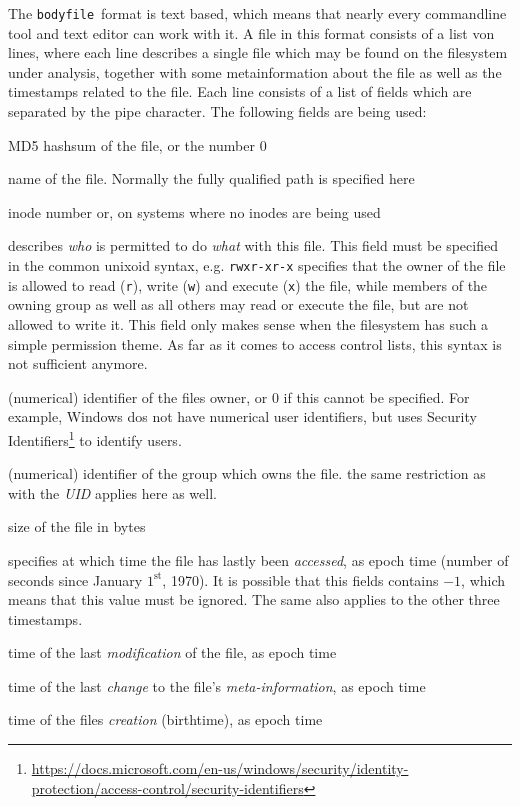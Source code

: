 \documentclass[twocolumn]{article}
\newcommand{\bodyfile}{\texttt{bodyfile}}
\begin{document}
The \bodyfile\ format is text based, which means that nearly every commandline tool and text editor can work with it. A file in this format consists of a list von lines, where each line describes a single file which may be found on the filesystem under analysis, together with some metainformation about the file as well as the timestamps related to the file. Each line consists of a list of fields which are separated by the pipe character. The following fields are being used:

\begin{description}[font=\ttfamily]
\item[MD5] MD5 hashsum of the file, or the number $0$
\item[name] name of the file. Normally the fully qualified path is specified here
\item[inode] inode number or, on systems where no inodes are being used
\item[mode] describes \emph{who} is permitted to do \emph{what} with this file. This field must be specified in the common unixoid syntax, e.g. \texttt{rwxr-xr-x} specifies that the owner of the file is allowed to read (\texttt{r}), write (\texttt{w}) and execute (\texttt{x}) the file, while members of the owning group as well as all others may read or execute the file, but are not allowed to write it. This field only makes sense when the filesystem has such a simple permission theme. As far as it comes to access control lists, this syntax is not sufficient anymore.
\item[UID] (numerical) identifier of the files owner, or $0$ if this cannot be specified. For example, Windows dos not have numerical user identifiers, but uses Security Identifiers\footnote{\url{https://docs.microsoft.com/en-us/windows/security/identity-protection/access-control/security-identifiers}} to identify users.
\item[GID] (numerical) identifier of the group which owns the file. the same restriction as with the \emph{UID} applies here as well.
\item[size] size of the file in bytes
\item[atime] specifies at which time the file has lastly been \emph{accessed}, as epoch time (number of seconds since January $1^\text{st}$, 1970). It is possible that this fields contains $-1$, which means that this value must be ignored. The same also applies to the other three timestamps.
\item[mtime] time of the last \emph{modification} of the file, as epoch time
\item[ctime] time of the last \emph{change} to the file's \emph{meta-information}, as epoch time
\item[crtime] time of the files \emph{creation} (birthtime), as epoch time
\end{description}
\end{document}
